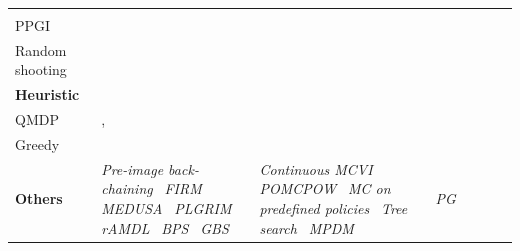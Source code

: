 \documentclass[journal]{IEEEtran}
\begin{document}
\begin{table}[!t]
\begin{tabularx}{\textwidth}{LLLLLLL}
    &
    \cite{bai2012unmanned} &
    &
    &
    \\
    \hspace{0.5em}PPGI~\cite{pajarinen2017robotic}  &
    &
    &
    &
    \cite{pajarinen2014robotic,pajarinen2017robotic,pajarinen2020pomdp} &
    \cite{hoelscher2018utilizing} &
    \\
    \hspace{0.5em}Random shooting  &
    \cite{dallaire2009bayesian,martinez2009bayesian} &
    &
    &
    &
    &
    \cite{wang2017anticipatory}\\
\midrule
 \textbf{Heuristic} \\ %
    \hspace{0.5em}QMDP~\cite{littman1995learning} &
    \cite{koenig1998xavier}{,\cite{kim2021plgrim}} &
    \cite{wei2011point} &
    &
    &
    &
    \cite{spaan2008cooperative}\\
    \hspace{0.5em}Greedy &
    &
    &
    \cite{eidenberger2010active,valimaki2016optimizing} &
    &
    &
    \cite{ahmadi2019safe}\\
\midrule
 \textbf{Others} &
    \textit{Pre-image back-chaining}~\cite{kaelbling2017pre,kaelbling2013integrated}\newline
    \textit{FIRM~}\cite{agha2014firm,agha2014health}\newline
    \textit{MEDUSA~}\cite{jaulmes2007formal}\newline
    {\textit{PLGRIM~}\cite{kim2021plgrim}}\newline
    \textit{rAMDL~}\cite{kopitkov2017no}\newline
    \textit{BPS~}\cite{wang2018bounded}\newline
    \textit{GBS}~\cite{indelman2015planning}
    &
    \textit{Continuous MCVI~}\cite{brechtel2013solving,brechtel2014probabilistic}\newline
    {\textit{POMCPOW~}\cite{sunberg2018online}}\newline
    \textit{MC on predefined policies~}\cite{song2016intention}\newline
    \textit{Tree search~}\cite{ulbrich2015towards}\newline
    \textit{MPDM~}\cite{cunningham2015mpdm}
    &
    \textit{PG~}\cite{buffet2009factored,zhang2013active}\newline

\end{tabularx}
\end{table}
\end{document}
